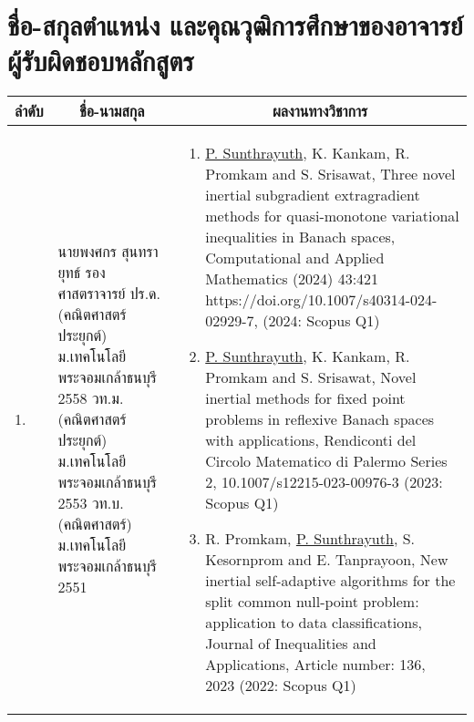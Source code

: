 \section{ชื่อ-สกุลตำแหน่ง และคุณวุฒิการศึกษาของอาจารย์ผู้รับผิดชอบหลักสูตร}
{\small
\begin{center}
\begin{longtable}{|p{}|p{}|p{}|}
	\hline
	\multicolumn{1}{|c|}{\textbf{ลำดับ}} &
	\multicolumn{1}{c|}{\textbf{ชื่อ-นามสกุล}} &
	\multicolumn{1}{c|}{\textbf{ผลงานทางวิชาการ}}\\
	\hline
\endhead	



1. &
นายพงศกร สุนทรายุทธ์ \newline 
รองศาสตราจารย์	\newline
ปร.ด.(คณิตศาสตร์ประยุกต์) \newline ม.เทคโนโลยีพระจอมเกล้าธนบุรี 2558 \newline
วท.ม.(คณิตศาสตร์ประยุกต์) \newline ม.เทคโนโลยีพระจอมเกล้าธนบุรี 2553  \newline
วท.บ.(คณิตศาสตร์) \newline ม.เทคโนโลยีพระจอมเกล้าธนบุรี 2551
&
\begin{enumerate}[series=tar]
	\item \underline{P. Sunthrayuth}, K. Kankam, R. Promkam and S. Srisawat, Three novel inertial subgradient extragradient methods for quasi-monotone variational inequalities in Banach spaces, Computational and Applied Mathematics (2024) 43:421 https://doi.org/10.1007/s40314-024-02929-7, (2024: Scopus Q1)
	\item \underline{P. Sunthrayuth}, K. Kankam, R. Promkam and S. Srisawat, Novel inertial methods for fixed point problems in reflexive Banach spaces with applications, Rendiconti del Circolo Matematico di Palermo Series 2, 10.1007/s12215-023-00976-3 (2023: Scopus Q1)
	\item R. Promkam, \underline{P. Sunthrayuth}, S. Kesornprom and E. Tanprayoon, New inertial self-adaptive algorithms for the split common null-point problem: application to data classifications, Journal of Inequalities and Applications, Article number: 136, 2023 (2022: Scopus Q1)

\end{enumerate}
\end{longtable}
\end{center}}
